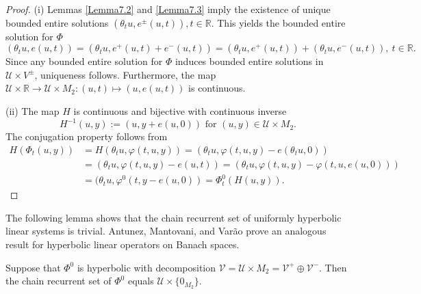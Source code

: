 \documentclass{siamltex}%
\begin{document}
\begin{proof}
(i) Lemmas \ref{Lemma7.2} and \ref{Lemma7.3} imply the existence of unique
bounded entire solutions $(\theta_{t}u,e^{\pm}(u,t)),\allowbreak
t\in\mathbb{R}$. This yields the bounded entire solution for $\Phi$%
\[
(\theta_{t}u,e(u,t))=(\theta_{t}u,e^{+}(u,t)+e^{-}(u,t))=(\theta_{t}%
u,e^{+}(u,t))+(\theta_{t}u,e^{-}(u,t)),~t\in\mathbb{R}.
\]
Since any bounded entire solution for $\Phi$ induces bounded entire solutions
in $\mathcal{U\times}V^{\pm}$, uniqueness follows. Furthermore, the map
$\mathcal{U}\times\mathbb{R}\rightarrow\mathcal{U}\times M_{2}:(u,t)\mapsto
(u,e(u,t))$ is continuous.

(ii) The map $H$ is continuous and bijective with continuous inverse
\[
H^{-1}(u,y):=(u,y+e(u,0))\text{ for }(u,y)\in\mathcal{U}\times M_{2}.
\]
The conjugation property follows from%
\begin{align*}
H(\Phi_{t}(u,y))  &  =H(\theta_{t}u,\varphi(t,u,y))=(\theta_{t}u,\varphi
(t,u,y)-e(\theta_{t}u,0))\\
&  =(\theta_{t}u,\varphi(t,u,y)-e(u,t))=(\theta_{t}u,\varphi(t,u,y)-\varphi
(t,u,e(u,0)))\\
&  =(\theta_{t}u,\varphi^{0}(t,y-e(u,0))=\Phi_{t}^{0}(H(u,y)).
\end{align*}

\end{proof}

The following lemma shows that the chain recurrent set of uniformly hyperbolic
linear systems is trivial. Antunez, Mantovani, and Var\~{a}o \cite[Corollary
2.11]{AntMV22} prove an analogous result for hyperbolic linear operators on
Banach spaces.

\begin{lemma}
\label{Lemma_trivial}Suppose that $\Phi^{0}$ is hyperbolic with decomposition
$\mathcal{V}=\mathcal{U}\times M_{2}=\mathcal{V}^{+}\oplus\mathcal{V}^{-}$.
Then the chain recurrent set of $\Phi^{0}$ equals $\mathcal{U}\times
\{0_{M_{2}}\}$.
\end{lemma}
\end{document}
